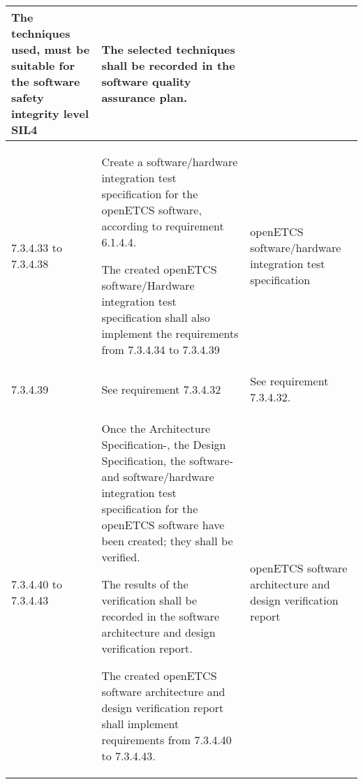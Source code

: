 \documentclass{template/openetcs_report}
\begin{document}
{\begin{longtable}{|p{2cm}|p{9cm}|p{3cm}|}
The techniques used, must be suitable for the software safety integrity level SIL4
& The selected techniques shall be recorded in the software quality assurance plan.\\ 
\hline
7.3.4.33 to 7.3.4.38 & Create a software/hardware integration test specification for the openETCS software, according to requirement 6.1.4.4.

The created openETCS software/Hardware integration test specification shall also implement the requirements from 7.3.4.34 to 7.3.4.39
& openETCS software/hardware integration test specification\\ 
\hline
7.3.4.39 & See requirement 7.3.4.32 & See requirement 7.3.4.32.\\ 
\hline
7.3.4.40 to 7.3.4.43 & Once the Architecture Specification-, the Design Specification, the software- and  software/hardware integration test specification for the openETCS software have been created; they shall be verified.

The results of the verification shall be recorded in the software architecture and design verification report.

The created openETCS software architecture and design verification report shall implement requirements from 7.3.4.40 to 7.3.4.43.
& openETCS software architecture and design verification report \\ 
\hline
\end{longtable}}
\end{document}
